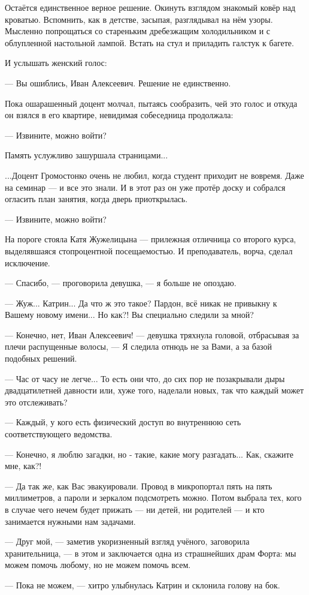 Остаётся единственное верное решение. Окинуть взглядом знакомый ковёр над кроватью.
Вспомнить, как в детстве, засыпая, разглядывал на нём узоры.
Мысленно попрощаться со стареньким дребезжащим холодильником и с облупленной настольной лампой.
Встать на стул и приладить галстук к багете.

И услышать женский голос:

--- Вы ошиблись, Иван Алексеевич. Решение не единственно.

\emptypar

Пока ошарашенный доцент молчал, пытаясь сообразить, чей это голос и откуда он взялся в его квартире,
невидимая собеседница продолжала:

--- Извините, можно войти?

Память услужливо зашуршала страницами...

\begin{achronic}

...Доцент Громостонко очень не любил, когда студент приходит не вовремя. Даже на семинар --- и все это знали.
И в этот раз он уже протёр доску и собрался огласить план занятия, когда дверь приоткрылась.

--- Извините, можно войти?

На пороге стояла Катя Жужелицына --- прилежная отличница со второго курса, выделявшаяся стопроцентной посещаемостью.
И преподаватель, ворча, сделал исключение.

--- Спасибо, --- проговорила девушка, --- я больше не опоздаю.

\end{achronic}

--- Жуж... Катрин... Да что ж это такое? Пардон, всё никак не привыкну к Вашему новому имени... Но как?!
Вы специально следили за мной?

--- Конечно, нет, Иван Алексеевич! --- девушка тряхнула головой, отбрасывая за плечи распущенные волосы,
--- Я следила отнюдь не за Вами, а за базой подобных решений.

--- Час от часу не легче... То есть они что, до сих пор не позакрывали дыры двадцатилетней давности или,
хуже того, наделали новых, так что каждый может это отслеживать?

--- Каждый, у кого есть физический доступ во внутреннюю сеть соответствующего ведомства.

--- Конечно, я люблю загадки, но - такие, какие могу разгадать... Как, скажите мне, как?!

--- Да так же, как Вас эвакуировали. Провод в микропортал пять на пять миллиметров, а пароли и зеркалом подсмотреть можно.
Потом выбрала тех, кого в случае чего нечем будет прижать --- ни детей, ни родителей --- и кто занимается нужными нам задачами.

--- Друг мой, --- заметив укоризненный взгляд учёного, заговорила хранительница, ---
в этом и заключается одна из страшнейших драм Форта: мы можем помочь любому, но не можем помочь всем.

--- Пока не можем, --- хитро улыбнулась Катрин и склонила голову на бок.

\emptypar


\emptypar

